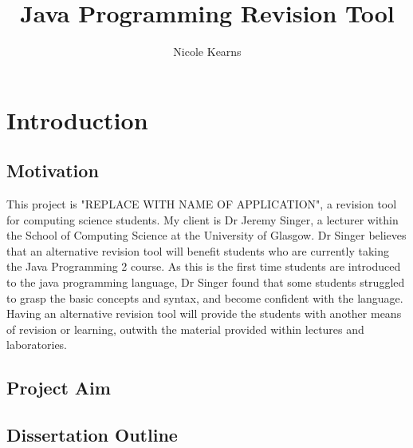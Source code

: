 \documentclass{article}
\begin{document}
\title{Java Programming Revision Tool}
\author{Nicole Kearns}
\maketitle
\tableofcontents

\newpage

\section{Introduction}

\subsection{Motivation}

This project is "REPLACE WITH NAME OF APPLICATION", a revision tool for computing science students. My client is Dr Jeremy Singer, a lecturer within the School of Computing Science at the University of Glasgow. Dr Singer believes that an alternative revision tool will benefit students who are currently taking the Java Programming 2 course. As this is the first time students are introduced to the java programming language, Dr Singer found that some students struggled to grasp the basic concepts and syntax, and become confident with the language. Having an alternative revision tool will provide the students with another means of revision or learning, outwith the material provided within lectures and laboratories.

\subsection{Project Aim}

\subsection{Dissertation Outline}
\end{document}
